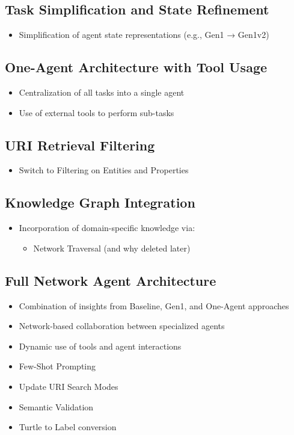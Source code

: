 \documentclass[a4paper,oneside,bibliography=totoc]{scrbook}
\begin{document}
\subsection{Task Simplification and State Refinement}
\label{subsec:task_simplification_state_refinement}
\begin{itemize}
  \item Simplification of agent state representations (e.g., Gen1 → Gen1v2)
\end{itemize}

\subsection{One-Agent Architecture with Tool Usage}
\label{subsec:one_agent_architecture_tool_usage}
\begin{itemize}
  \item Centralization of all tasks into a single agent
  \item Use of external tools to perform sub-tasks
\end{itemize}

\subsection{URI Retrieval Filtering}
\label{subsec:uri_retrieval_filtering}
\begin{itemize}
  \item Switch to Filtering on Entities and Properties
\end{itemize}

\subsection{Knowledge Graph Integration}
\label{subsec:knowledge_graph_integration}
\begin{itemize}
  \item Incorporation of domain-specific knowledge via:
        \begin{itemize}
          \item Network Traversal (and why deleted later)

        \end{itemize}
\end{itemize}

\subsection{Full Network Agent Architecture}
\label{subsec:full_network_agent_architecture}
\begin{itemize}
  \item Combination of insights from Baseline, Gen1, and One-Agent approaches
  \item Network-based collaboration between specialized agents
  \item Dynamic use of tools and agent interactions
  \item Few-Shot Prompting
  \item Update URI Search Modes
  \item Semantic Validation
  \item Turtle to Label conversion
\end{itemize}
\end{document}
